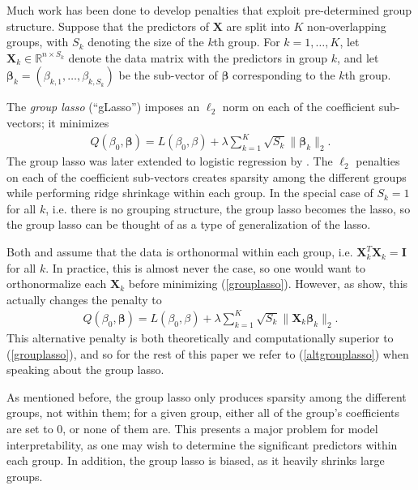 \documentclass[11pt]{article}
\newcommand{\citeay}[1]{\citeauthor{#1} \citeyear{#1}}
\begin{document}
Much work has been done to develop penalties that exploit pre-determined group structure. Suppose that the predictors of $\mathbf{X}$ are split into $K$ non-overlapping groups, with $S_k$ denoting the size of the $k$th group. For $k = 1, \ldots, K$, let $\mathbf{X}_k \in \mathbb{R}^{n \times S_k}$ denote the data matrix with the predictors in group $k$, and let $\bm{\beta}_k = (\beta_{k,1}, \ldots, \beta_{k, S_k})$ be the sub-vector of $\bm{\beta}$ corresponding to the $k$th group. 

The \textit{group lasso} (``gLasso'') \cite{yuan2006model} imposes an $\ell_2$ norm on each of the coefficient sub-vectors; it minimizes 
\begin{align}
    \label{grouplasso}
    Q(\beta_0, \bm{\beta}) = L(\beta_0, \beta) + \lambda \sum_{k=1}^K \sqrt{S_k} \| \bm{\beta}_k \|_2.
\end{align}
The group lasso was later extended to logistic regression by \citeay{meier2008group}. The $\ell_2$ penalties on each of the coefficient sub-vectors creates sparsity among the different groups while performing ridge shrinkage within each group. In the special case of $S_k = 1$ for all $k$, i.e. there is no grouping structure, the group lasso becomes the lasso, so the group lasso can be thought of as a type of generalization of the lasso.

Both \citeay{yuan2006model} and \citeay{meier2008group} assume that the data is orthonormal within each group, i.e. $\mathbf{X}_k^T \mathbf{X}_k = \mathbf{I}$ for all $k$. In practice, this is almost never the case, so one would want to orthonormalize each $\mathbf{X}_k$ before minimizing (\ref{grouplasso}). However, as \citeay{simon2012standardization} show, this actually changes the penalty to
\begin{align}
    \label{altgrouplasso}
    Q(\beta_0, \bm{\beta}) = L(\beta_0, \beta) + \lambda \sum_{k=1}^K \sqrt{S_k} \| \mathbf{X}_k \bm{\beta}_k \|_2.
\end{align}
This alternative penalty is both theoretically and computationally superior \cite{breheny2015group} to (\ref{grouplasso}), and so for the rest of this paper we refer to (\ref{altgrouplasso}) when speaking about the group lasso. 

As mentioned before, the group lasso only produces sparsity among the different groups, not within them; for a given group, either all of the group's coefficients are set to 0, or none of them are. This presents a major problem for model interpretability, as one may wish to determine the significant predictors within each group. In addition, the group lasso is biased, as it heavily shrinks large groups. 
\end{document}
